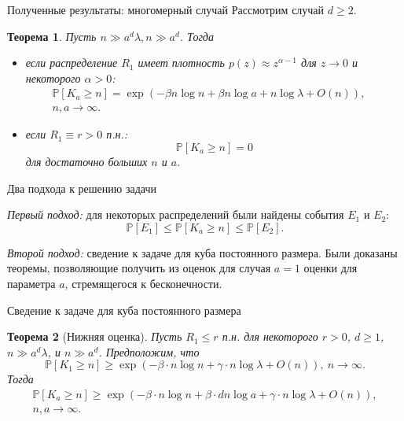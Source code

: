 \documentclass{beamer}
\theoremstyle{plain}
\newtheorem{thm}{Теорема} %
\theoremstyle{definition}
\theoremstyle{remark}
\def\geq{\geqslant}
\def\leq{\leqslant}
\newcommand{\PP}{\mathbb{P}}
\begin{document}
\begin{frame}{Полученные результаты: многомерный случай}
Рассмотрим случай $d \geq 2$.
\begin{thm}
Пусть $n\gg a^d\lambda, n\gg a^d$. Тогда
\begin{itemize}
    \item если распределение $R_1$ имеет плотность $p(z)\approx z^{\alpha-1}$ для $z\to 0$ и некоторого $\alpha > 0$:
    \begin{multline*}
    \PP[K_a\geq n] = \exp(-\beta n\log n + \beta n\log a 
    +n\log\lambda +O(n)),\quad \\
    n,a \to\infty.
\end{multline*}
\item если $R_1\equiv r>0$ п.н.:
\begin{equation*}
    \PP[K_a\geq n] = 0
\end{equation*}
для достаточно больших  $n$ и $a$.
\end{itemize}
\end{thm}


\end{frame}{}

\begin{frame}{Два подхода к решению задачи}

{\it Первый подход:} для некоторых распределений были найдены события $E_1$ и $E_2$:
$$\PP[E_1] \leq \PP[K_a \geq n] \leq \PP[E_2].$$

{\it Второй подход:} сведение к задаче для куба постоянного размера. Были доказаны теоремы, позволяющие получить из оценок для случая $a=1$ оценки для параметра $a$, стремящегося к бесконечности.
    
\end{frame}

\begin{frame}{Сведение к задаче для куба постоянного размера}

\begin{thm}[Нижняя оценка]
    Пусть $R_1\leq r$ п.н. для некоторого $r>0$, $d\geq 1$, $n \gg a^d\lambda$, и $n\gg a^d$. 
Предположим, что 
\begin{equation*}
    \PP[K_1 \geq n] \geq \exp \left(-\beta\cdot n\log n + \gamma\cdot n\log\lambda + O(n)\right),\  n \to \infty.
 \end{equation*}{}
Тогда 
\begin{multline*}
    \PP[K_a \geq n] \geq \exp \left(-\beta\cdot n\log n + \beta\cdot dn\log a + \gamma\cdot n\log\lambda + O(n)\right),\\  n, a \to \infty.
\end{multline*}{}
\end{thm}
    
\end{frame}
\end{document}
